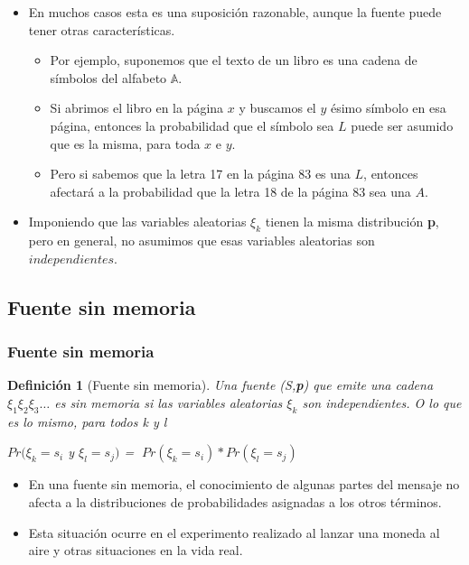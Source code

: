 \documentclass{beamer}
\newtheorem{definicion} [Definicion]{Definición}
\begin{document}
\begin{frame}      \small

\begin{itemize}
\item En muchos casos esta es una suposición razonable, aunque la fuente puede tener otras características. 
 

\begin{itemize}
\item Por ejemplo, suponemos que el texto de un libro es una cadena de símbolos del alfabeto $\mathbb{A}$. 

\item Si abrimos el libro en la página $x$ y buscamos el $y$ ésimo símbolo en esa página, entonces la probabilidad que el símbolo sea $L$ puede ser asumido que es la misma, para toda $x$ e $y$.

\item Pero si sabemos que la letra 17 en la página 83 es una $L$, entonces afectará a la probabilidad que la letra 18 de la página 83 sea una $A$. 
\end{itemize}

\item Imponiendo que las variables aleatorias $\xi_k$  tienen la misma distribución \textbf{p}, pero en general, no asumimos que esas variables aleatorias son $independientes$.
\end{itemize}

\end{frame}
\subsection{Fuente sin memoria}
\begin{frame}  \frametitle{Fuente sin memoria}    \small
\begin{definicion}[Fuente sin memoria]
Una fuente (S,\textbf{p}) que emite una cadena $\xi_1 \xi_2 \xi_3 \ldots $ es sin memoria si las variables aleatorias $\xi_k$ son independientes. O lo que es lo mismo, para todos \textit{k} y \textit{l}

\begin{center}
$Pr(\xi_k =s_i$ y $\xi_l =s_j)$ = $\;Pr(\xi_k =s_i) *  Pr(\xi_l =s_j)$
\end{center}
\end{definicion}

\begin{itemize}
\item  En una fuente sin memoria, el conocimiento de algunas partes del mensaje no afecta a la distribuciones de probabilidades asignadas a los otros términos. 

\item Esta situación ocurre en el experimento realizado al lanzar una moneda al aire y otras situaciones en la vida real.
\end{itemize}

\end{frame}
\end{document}
